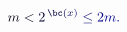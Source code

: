\documentclass[12pt]{article}
\begin{document}
\makeatletter
\renewcommand*{\@textcolor}[3]{%
  \protect\leavevmode
  \begingroup
    \color#1{#2}#3%
  \endgroup
}
\makeatother
\begin{displaymath}
\mathcolor[RGB]{0,0,15}{m} \mathcolor[RGB]{0,0,30}{<} \mathcolor[RGB]{0,0,45}{2} ^ { \, \mathcolor[RGB]{0,0,60}{\bc} \mathcolor[RGB]{0,0,75}{(} \mathcolor[RGB]{0,0,90}{x} \mathcolor[RGB]{0,0,105}{)} } \mathcolor[RGB]{0,0,120}{\le} \mathcolor[RGB]{0,0,135}{2} \mathcolor[RGB]{0,0,150}{m} \mathcolor[RGB]{0,0,165}{.}
\end{displaymath}
\end{document}
